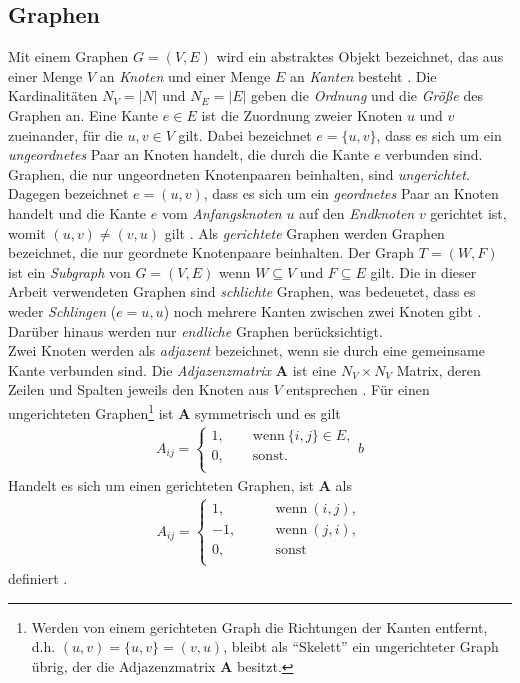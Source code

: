 \documentclass[12pt, a4paper]{report}
\begin{document}
\subsection{Graphen}
Mit einem Graphen $G=(V,E)$ wird ein abstraktes Objekt bezeichnet, das aus einer Menge $V$ an \textit{Knoten} und einer Menge $E$ an \textit{Kanten} besteht \cite{brandes2005graphfunda}. Die Kardinalitäten $N_V =|N|$ und $N_E=|E|$ geben die \textit{Ordnung} und die \textit{Größe} des Graphen an. Eine Kante $e \in E$ ist die Zuordnung zweier Knoten $u$ und $v$ zueinander, für die $u,v \in V$ gilt. Dabei bezeichnet $e=\{u,v\}$, dass es sich um ein \textit{ungeordnetes} Paar an Knoten handelt, die durch die Kante $e$ verbunden sind. Graphen, die nur ungeordneten Knotenpaaren beinhalten, sind \textit{ungerichtet}. Dagegen bezeichnet $e=(u,v)$, dass es sich um ein \textit{geordnetes} Paar an Knoten handelt und die Kante $e$ vom \textit{Anfangsknoten} $u$ auf den \textit{Endknoten} $v$ gerichtet ist, womit $(u,v) \neq (v, u)$ gilt \cite{kolaczyk2009statistical}. Als \textit{gerichtete} Graphen werden Graphen bezeichnet, die nur geordnete Knotenpaare beinhalten. Der Graph $T=(W,F)$ ist ein \textit{Subgraph} von $G=(V,E)$ wenn $W \subseteq V$ und $F \subseteq E$ gilt. Die in dieser Arbeit verwendeten Graphen sind \textit{schlichte} Graphen, was bedeuetet, dass es weder \textit{Schlingen} ($e={u,u}$) noch mehrere Kanten zwischen zwei Knoten gibt \cite{tittmann2011graphen}. Darüber hinaus werden nur \textit{endliche} Graphen berücksichtigt.\\
Zwei Knoten werden als \textit{adjazent} bezeichnet, wenn sie durch eine gemeinsame Kante verbunden sind. Die \textit{Adjazenzmatrix} $\textbf{A}$ ist eine $N_V \times N_V $ Matrix, deren Zeilen und Spalten jeweils den Knoten aus $V$ entsprechen \cite{kolaczyk2009statistical}. Für einen ungerichteten Graphen\footnote{Werden von einem gerichteten Graph die Richtungen der Kanten entfernt, d.h. $(u,v)=\{u,v\}=(v,u)$, bleibt als "`Skelett"' ein ungerichteter Graph übrig, der die Adjazenzmatrix $\textbf{A}$ besitzt.} ist $\textbf{A}$ symmetrisch und es gilt 
\begin{align*}
A_{ij} = \begin{cases}
1, \qquad \text{wenn} \ \{i,j\} \in E,\\
0, \qquad \text{sonst.}\\
\end{cases}b
\end{align*}
Handelt es sich um einen gerichteten Graphen, ist $\textbf{A}$ als
\begin{align*}
A_{ij} = \begin{cases}
1, \qquad &\text{wenn} \ (i,j),\\
-1, \qquad &\text{wenn} \ (j,i),\\
0, \qquad &\text{sonst}\\
\end{cases}
\end{align*}
definiert \cite{brandes2005graphfunda}.
\end{document}

